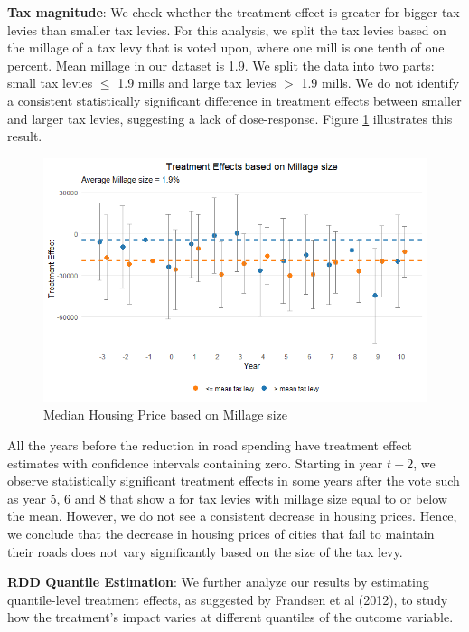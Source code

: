 \vskip 1cm

\textbf{Tax magnitude}: We check whether the treatment effect is greater for bigger tax levies than smaller tax levies. For this analysis, we split the tax levies based on the millage of a tax levy that is voted upon, where one mill is one tenth of one percent. Mean millage in our dataset is 1.9. We split the data into two parts: small tax levies $\le$ 1.9 mills and large tax levies $>$ 1.9 mills. We do not identify a consistent statistically significant difference in treatment effects between smaller and larger tax levies, suggesting a lack of dose-response. Figure \ref{fig:tes_covs_size} illustrates this result.

\begin{figure}[htbp]
    \centering
    \includegraphics[width=\textwidth,keepaspectratio]{images/tes_size_re.png}    
    \caption{Median Housing Price based on Millage size}
    \label{fig:tes_covs_size}
\end{figure}

All the years before the reduction in road spending have treatment effect estimates with confidence intervals containing zero. Starting in year $t+2$, we observe statistically significant treatment effects in some years after the vote such as year 5, 6 and 8 that show a for tax levies with millage size equal to or below the mean. However, we do not see a consistent decrease in housing prices. Hence, we conclude that the decrease in housing prices of cities that fail to maintain their roads does not vary significantly based on the size of the tax levy.

\vskip 1cm

\textbf{RDD Quantile Estimation}: We further analyze our results by estimating quantile-level treatment effects, as suggested by Frandsen et al (2012), to study how the treatment’s impact varies at different quantiles of the outcome variable. 

